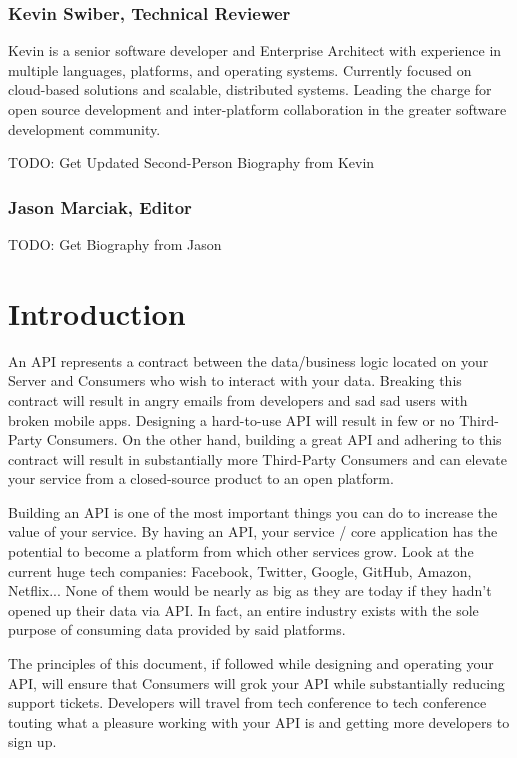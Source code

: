 \documentclass{book}
\begin{document}
\subsubsection*{Kevin Swiber, Technical Reviewer}

Kevin is a senior software developer and Enterprise Architect with experience in multiple languages, platforms, and operating systems. Currently focused on cloud-based solutions and scalable, distributed systems. Leading the charge for open source development and inter-platform collaboration in the greater software development community.

TODO: Get Updated Second-Person Biography from Kevin

\subsubsection*{Jason Marciak, Editor}

TODO: Get Biography from Jason

\tableofcontents

\newpage

\section{Introduction}

An API represents a contract between the data/business logic located on your Server and Consumers who wish to interact with your data. Breaking this contract will result in angry emails from developers and sad sad users with broken mobile apps. Designing a hard-to-use API will result in few or no Third-Party Consumers. On the other hand, building a great API and adhering to this contract will result in substantially more Third-Party Consumers and can elevate your service from a closed-source product to an open platform.

Building an API is one of the most important things you can do to increase the value of your service. By having an API, your service / core application has the potential to become a platform from which other services grow. Look at the current huge tech companies: Facebook, Twitter, Google, GitHub, Amazon, Netflix... None of them would be nearly as big as they are today if they hadn't opened up their data via API. In fact, an entire industry exists with the sole purpose of consuming data provided by said platforms.

The principles of this document, if followed while designing and operating your API, will ensure that Consumers will grok your API while substantially reducing support tickets. Developers will travel from tech conference to tech conference touting what a pleasure working with your API is and getting more developers to sign up.
\end{document}
